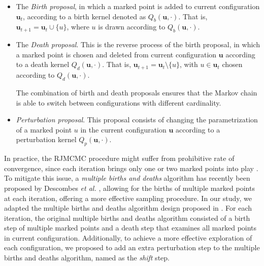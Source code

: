 \documentclass[journal]{IEEEtran}
\begin{document}
\begin{itemize}

\item The \textit{Birth proposal}, in which a marked point is added to
  current configuration $\mathbf{u}_t$, according to a birth kernel
  denoted as $Q_{b}(\mathbf{u}, \cdot)$. That is,
  $\mathbf{u}_{t+1} = \mathbf{u}_t \cup \{u\}$, where $u$ is drawn
  according to $Q_{b}(\mathbf{u}, \cdot)$.

\item The \textit{Death proposal}. This is the reverse process of the
  birth proposal, in which a marked point is chosen and deleted from
  current configuration $\mathbf{u}$ according to a death kernel
  $Q_{d}(\mathbf{u}, \cdot)$. That is,
  $\mathbf{u}_{t+1} = \mathbf{u}_t \setminus \{u\}$, with
  $u \in \mathbf{u}_t$ chosen according to $Q_{d}(\mathbf{u}, \cdot)$.

  The combination of birth and death proposals ensures that the Markov
  chain is able to switch between configurations with different
  cardinality.

\item \textit{Perturbation proposal}. This proposal consists of
  changing the parametrization of a marked point $u$ in the current
  configuration $\mathbf{u}$ according to a perturbation kernel
  $Q_{p}(\mathbf{u}, \cdot)$.

\end{itemize}

In practice, the RJMCMC procedure might suffer from prohibitive rate
of convergence, since each iteration brings only one or two marked
points into play \cite{descombes2013stochastic}. To mitigate this
issue, a \textit{multiple births and deaths} algorithm has recently
been proposed by Descombes \textit{et al.} \cite{descombes2009object},
allowing for the births of multiple marked points at each iteration,
offering a more effective sampling procedure. In our study, we adapted
the multiple births and deaths algorithm design proposed in
\cite{descombes2009object}. For each iteration, the original multiple
births and deaths algorithm consisted of a birth step of multiple
marked points and a death step that examines all marked points in
current configuration. Additionally, to achieve a more effective
exploration of each configuration, we proposed to add an extra
perturbation step to the multiple births and deaths algorithm, named
as the \textit{shift} step.
\end{document}
